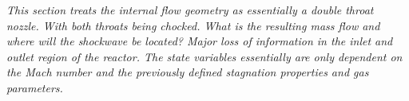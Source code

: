 {\color{greenColor}\itshape
This section treats the internal flow geometry as essentially a double throat nozzle. With both throats being chocked.
What is the resulting mass flow and where will the shockwave be located?
Major loss of information in the inlet and outlet region of the reactor.
The state variables essentially are only dependent on the Mach number and the previously defined stagnation properties and gas parameters.
}
